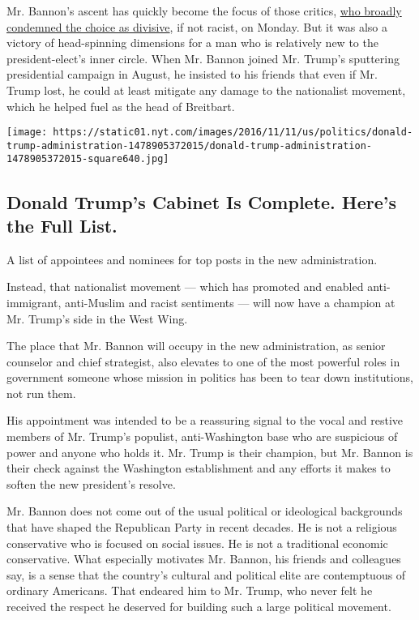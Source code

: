 Mr. Bannon's ascent has quickly become the focus of those critics,
\href{http://www.nytimes.com/2016/11/15/us/politics/donald-trump-presidency.html?hp\&action=click\&pgtype=Homepage\&clickSource=story-heading\&module=a-lede-package-region\&region=top-news\&WT.nav=top-news}{who
broadly condemned the choice as divisive}, if not racist, on Monday. But
it was also a victory of head-spinning dimensions for a man who is
relatively new to the president-elect's inner circle. When Mr. Bannon
joined Mr. Trump's sputtering presidential campaign in August, he
insisted to his friends that even if Mr. Trump lost, he could at least
mitigate any damage to the nationalist movement, which he helped fuel as
the head of Breitbart.

\href{https://www.nytimes.com/interactive/2016/us/politics/donald-trump-administration.html}{}

\texttt{[image: https://static01.nyt.com/images/2016/11/11/us/politics/donald-trump-administration-1478905372015/donald-trump-administration-1478905372015-square640.jpg]}

\hypertarget{donald-trumps-cabinet-is-complete-heres-the-full-list}{%
\subsection{Donald Trump's Cabinet Is Complete. Here's the Full
List.}\label{donald-trumps-cabinet-is-complete-heres-the-full-list}}

A list of appointees and nominees for top posts in the new
administration.

Instead, that nationalist movement --- which has promoted and enabled
anti-immigrant, anti-Muslim and racist sentiments --- will now have a
champion at Mr. Trump's side in the West Wing.

The place that Mr. Bannon will occupy in the new administration, as
senior counselor and chief strategist, also elevates to one of the most
powerful roles in government someone whose mission in politics has been
to tear down institutions, not run them.

His appointment was intended to be a reassuring signal to the vocal and
restive members of Mr. Trump's populist, anti-Washington base who are
suspicious of power and anyone who holds it. Mr. Trump is their
champion, but Mr. Bannon is their check against the Washington
establishment and any efforts it makes to soften the new president's
resolve.

Mr. Bannon does not come out of the usual political or ideological
backgrounds that have shaped the Republican Party in recent decades. He
is not a religious conservative who is focused on social issues. He is
not a traditional economic conservative. What especially motivates Mr.
Bannon, his friends and colleagues say, is a sense that the country's
cultural and political elite are contemptuous of ordinary Americans.
That endeared him to Mr. Trump, who never felt he received the respect
he deserved for building such a large political movement.

